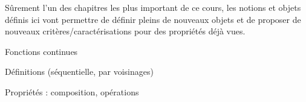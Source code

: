 
\minitoc  %

Sûrement l'un des chapitres les plus important de ce cours, les notions et objets définis ici vont permettre de 
définir pleins de nouveaux objets et de proposer de nouveaux critères/caractérisations pour des propriétés déjà vues. 

% 

Fonctions continues

Définitions (séquentielle, par voisinages)

Propriétés : composition, opérations